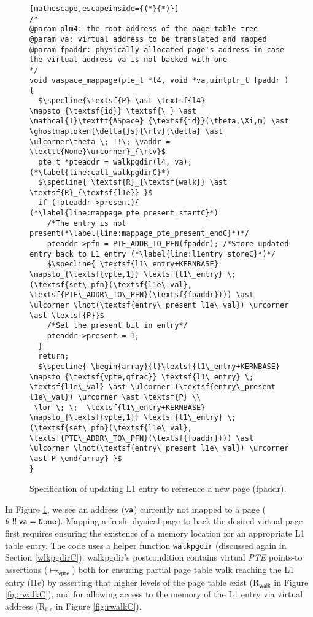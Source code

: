 \begin{figure}\footnotesize
  \begin{lstlisting}[mathescape,escapeinside={(*}{*)}]
/*
@param plm4: the root address of the page-table tree
@param va: virtual address to be translated and mapped
@param fpaddr: physically allocated page's address in case the virtual address va is not backed with one
*/
void vaspace_mappage(pte_t *l4, void *va,uintptr_t fpaddr ) {
  $\specline{\textsf{P} \ast \textsf{l4} \mapsto_{\textsf{id}} \textsf{\_} \ast \mathcal{I}\texttt{ASpace}_{\textsf{id}}(\theta,\Xi,m) \ast \ghostmaptoken{\delta{}s}{\rtv}{\delta} \ast \ulcorner\theta \; !!\; \vaddr = \texttt{None}\urcorner}_{\rtv}$      
  pte_t *pteaddr = walkpgdir(l4, va); (*\label{line:call_walkpgdirC}*)
  $\specline{ \textsf{R}_{\textsf{walk}} \ast \textsf{R}_{\textsf{l1e}} }$
  if (!pteaddr->present){ (*\label{line:mappage_pte_present_startC}*)
    /*The entry is not present(*\label{line:mappage_pte_present_endC}*)*/
    pteaddr->pfn = PTE_ADDR_TO_PFN(fpaddr); /*Store updated entry back to L1 entry (*\label{line:l1entry_storeC}*)*/
    $\specline{ \textsf{l1\_entry+KERNBASE} \mapsto_{\textsf{vpte,1}} \textsf{l1\_entry} \; (\textsf{set\_pfn}(\textsf{l1e\_val}, \textsf{PTE\_ADDR\_TO\_PFN}(\textsf{fpaddr}))) \ast  \ulcorner \lnot(\textsf{entry\_present l1e\_val}) \urcorner \ast \textsf{P}}$
    /*Set the present bit in entry*/
    pteaddr->present = 1;
  }
  return;
  $\specline{ \begin{array}{l}\textsf{l1\_entry+KERNBASE} \mapsto_{\textsf{vpte,qfrac}} \textsf{l1\_entry} \; \textsf{l1e\_val} \ast \ulcorner (\textsf{entry\_present l1e\_val}) \urcorner \ast \textsf{P} \\
 \lor \; \;  \textsf{l1\_entry+KERNBASE} \mapsto_{\textsf{vpte,1}} \textsf{l1\_entry} \; (\textsf{set\_pfn}(\textsf{l1e\_val}, \textsf{PTE\_ADDR\_TO\_PFN}(\textsf{fpaddr}))) \ast  \ulcorner \lnot(\textsf{entry\_present l1e\_val}) \urcorner \ast P \end{array} }$
}
\end{lstlisting}
\vspace{-1em}
  \caption{Specification of updating L1 entry to reference a new page (\textsf{fpaddr}).}
\label{fig:mapping_codeC}
\end{figure}

In Figure \ref{fig:mapping_codeC}, we see an address ($\mathsf{va}$) currently not
mapped to a page ($\theta \; !!\; \mathsf{va} = \texttt{None}$). Mapping a fresh
physical page to back the desired virtual page first requires ensuring
the existence of a memory location for an appropriate L1 table entry.
The code uses a helper function \lstinline{walkpgdir} (discussed again in Section \ref{wlkpgdirC}).
\textsf{walkpgdir}'s postcondition contains virtual \emph{PTE} points-to assertions ($\mapsto_{\textsf{vpte}}$)
both for ensuring partial page table walk reaching the
L1 entry (l1e) by asserting that higher levels of the page table exist (R$_{\textsf{walk}}$ in Figure \ref{fig:rwalkC}), 
and for allowing access to the memory of the L1 entry via virtual address (R$_{\textsf{l1e}}$ in Figure \ref{fig:rwalkC}).

